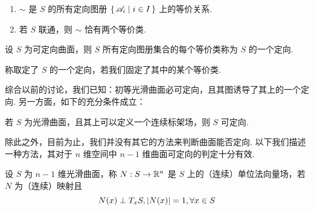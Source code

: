 \begin{property}
\begin{enumerate}
    \item $\sim$ 是 $S$ 的所有定向图册 $\set{\mathscr{A}_i|i\in I}$ 上的等价关系.
    
    \item 若 $S$ 联通，则 $\sim$ 恰有两个等价类.
\end{enumerate}
\end{property}

\begin{definition}
设 $S$ 为可定向曲面，则 $S$ 所有定向图册集合的每个等价类称为 $S$ 的一个定向.

称取定了 $S$ 的一个定向，若我们固定了其中的某个等价类.
\end{definition}


综合以前的讨论，我们已知：初等光滑曲面必可定向，且其图诱导了其上的一个定向. 另一方面，如下的充分条件成立：

\begin{property}
若 $S$ 为光滑曲面，且其上可以定义一个连续标架场，则 $S$ 可定向.
\end{property}

除此之外，目前为止，我们并没有其它的方法来判断曲面能否定向. 以下我们描述一种方法，其对于 $n$ 维空间中 $n-1$ 维曲面可定向的判定十分有效.

\begin{definition}
设 $S$ 为 $n-1$ 维光滑曲面，称 $N:S\to\mathbb{R}^n$ 是 $S$ 上的（连续）单位法向量场，若 $N$ 为（连续）映射且
$$
N(x)\perp T_xS,\left\lvert{N(x)}\right\rvert=1,\forall x\in S
$$
\end{definition}

